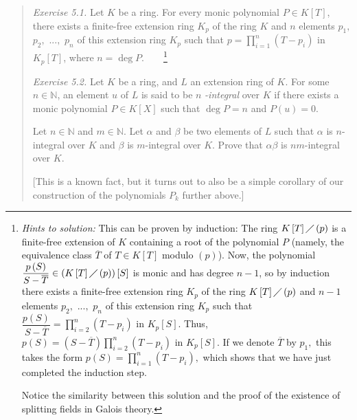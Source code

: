 \documentclass[12pt,final,notitlepage,onecolumn,german]{article}%
\begin{document}
\begin{quotation}
\textit{Exercise 5.1.} Let $K$ be a ring. For every monic polynomial $P\in
K\left[  T\right]  $, there exists a finite-free extension ring $K_{p}$ of the
ring $K$ and $n$ elements $p_{1},$ $p_{2},$ $...,$ $p_{n}$ of this extension
ring $K_{p}$ such that $p=\prod\limits_{i=1}^{n}\left(  T-p_{i}\right)  $ in
$K_{p}\left[  T\right]  $, where $n=\deg P$.\ \ \ \ \footnote{\textit{Hints to
solution:} This can be proven by induction: The ring $K\left[  T\right]
\diagup\left(  p\right)  $ is a finite-free extension of $K$ containing a root
of the polynomial $P$ (namely, the equivalence class $\overline{T}$ of $T\in
K\left[  T\right]  $ modulo $\left(  p\right)  $). Now, the polynomial
$\dfrac{p\left(  S\right)  }{S-\overline{T}}\in\left(  K\left[  T\right]
\diagup\left(  p\right)  \right)  \left[  S\right]  $ is monic and has degree
$n-1$, so by induction there exists a finite-free extension ring $K_{p}$ of
the ring $K\left[  T\right]  \diagup\left(  p\right)  $ and $n-1$ elements
$p_{2},$ $...,$ $p_{n}$ of this extension ring $K_{p}$ such that
$\dfrac{p\left(  S\right)  }{S-\overline{T}}=\prod\limits_{i=2}^{n}\left(
T-p_{i}\right)  $ in $K_{p}\left[  S\right]  $. Thus, $p\left(  S\right)
=\left(  S-\overline{T}\right)  \prod\limits_{i=2}^{n}\left(  T-p_{i}\right)
$ in $K_{p}\left[  S\right]  $. If we denote $\overline{T}$ by $p_{1},$ this
takes the form $p\left(  S\right)  =\prod\limits_{i=1}^{n}\left(
T-p_{i}\right)  ,$ which shows that we have just completed the induction step.
\par
Notice the similarity between this solution and the proof of the existence of
splitting fields in Galois theory.}

\textit{Exercise 5.2.} Let $K$ be a ring, and $L$ an extension ring of $K$.
For some $n\in\mathbb{N}$, an element $u$ of $L$ is said to be $n$%
\textit{-integral} over $K$ if there exists a monic polynomial $P\in K\left[
X\right]  $ such that $\deg P=n$ and $P\left(  u\right)  =0$.

Let $n\in\mathbb{N}$ and $m\in\mathbb{N}$. Let $\alpha$ and $\beta$ be two
elements of $L$ such that $\alpha$ is $n$-integral over $K$ and $\beta$ is
$m$-integral over $K$. Prove that $\alpha\beta$ is $nm$-integral over $K$.

[This is a known fact, but it turns out to also be a simple corollary of our
construction of the polynomials $P_{k}$ further above.]\ \ \ \ 
\end{quotation}

\begin{center}
\end{center}
\end{document}
